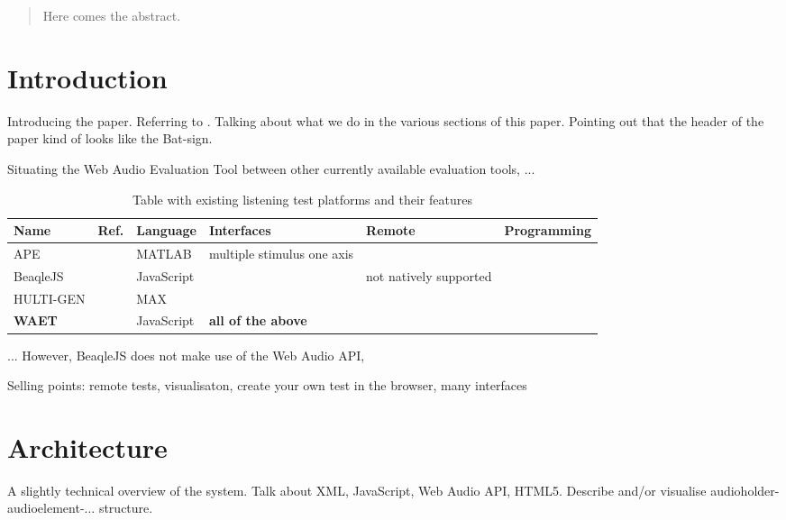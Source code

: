 \documentclass{sig-alternate}
\begin{document}
\maketitle
\begin{abstract}
Here comes the abstract. 
\end{abstract}


\section{Introduction}
	Introducing the paper. Referring to \cite{waet}. Talking about what we do in the various sections of this paper. Pointing out that the header of the paper kind of looks like the Bat-sign. 
	
	Situating the Web Audio Evaluation Tool between other currently available evaluation tools, ...
	
	\begin{table*}[htdp]
        \caption{Table with existing listening test platforms and their features}
        \begin{center}
        	\begin{tabular}{|*{6}{l|}}
        		\hline
        		\textbf{Name} 	& \textbf{Ref.} 	& \textbf{Language} 	& \textbf{Interfaces} 			& \textbf{Remote} 			& \textbf{Programming} 	\\
        		\hline
        		APE 			& \cite{ape}		& MATLAB				& multiple stimulus one axis 	& 							& \checkmark			\\
        		BeaqleJS		& \cite{beaqlejs}	& JavaScript			& 								& not natively supported 	& \\
        		HULTI-GEN 		& \cite{hultigen}	& MAX 					& 								& 							& \\
        		\textbf{WAET}	& \cite{waet}		& JavaScript			& \textbf{all of the above}		& \checkmark				& \\
        		\hline
        	\end{tabular}
        \end{center}
        \label{tab:toolboxes}
        \end{table*}%

        ... However, BeaqleJS \cite{beaqlejs} does not make use of the Web Audio API, %

        Selling points: remote tests, visualisaton, create your own test in the browser, many interfaces

	
\section{Architecture}  %
	A slightly technical overview of the system. Talk about XML, JavaScript, Web Audio API, HTML5. 
	Describe and/or visualise audioholder-audioelement-... structure. 
\end{document}
